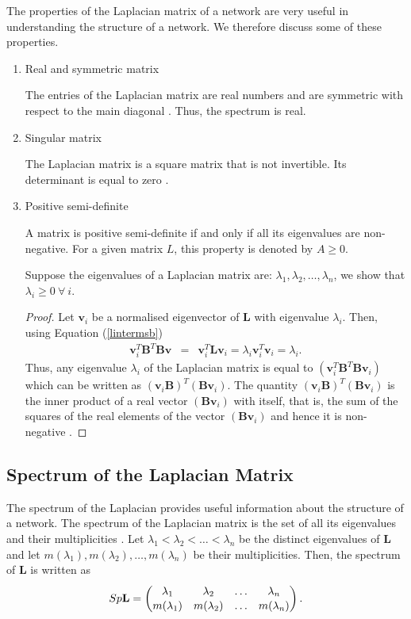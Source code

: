 \documentclass[10pt,a4paper]{article}
\begin{document}
The properties of the Laplacian matrix of a network are very useful in understanding the structure of a network. We therefore discuss some of these properties.
\begin{enumerate}	
\item{Real and symmetric matrix} 

The entries of the Laplacian matrix are real numbers and are symmetric with respect to the main diagonal \citep{das2004laplacian}. Thus, the spectrum is real.
\item{Singular matrix}

The Laplacian matrix is a square matrix that is not invertible. Its determinant is equal to zero \citep{das2004laplacian}.
\item{Positive semi-definite}

A matrix is positive semi-definite if and only if all its eigenvalues are non-negative. For a given matrix $L$, this property is denoted by $A\geq 0$. 

Suppose the eigenvalues of a Laplacian matrix are: $\lambda_1,\lambda_2,\ldots, \lambda_n$, we show that $\lambda_i \geq 0 ~\forall~i$.
\begin{proof}
	Let $\mathbf{v}_i$ be a normalised eigenvector of $\mathbf{L}$ with eigenvalue $\lambda_i$. Then, using Equation (\ref{lintermsb})
	\begin{eqnarray*}
		\mathbf{v}_i^T \mathbf{B}^T \mathbf{B} \mathbf{v} &=& \mathbf{v}_i^T \mathbf{L} \mathbf{v}_i = \lambda_i  \mathbf{v}_i^T \mathbf{v}_i  = \lambda_i.
	\end{eqnarray*}  
	Thus, any eigenvalue $\lambda_i$ of the Laplacian matrix is equal 
	to $(\mathbf{v}_i^T \mathbf{B}^T \mathbf{B} \mathbf{v}_i)$ which can be written as $(\mathbf{v}_i \mathbf{B})^T (\mathbf{B} \mathbf{v}_i)$. The quantity $(\mathbf{v}_i \mathbf{B})^T (\mathbf{B} \mathbf{v}_i)$  is the inner product of a real vector $(\mathbf{B} \mathbf{v}_i)$ with itself, that is, the sum of the squares of the real elements of the vector $(\mathbf{B} \mathbf{v}_i)$ and hence it is non-negative \citep{estrada2015first}.
\end{proof}

\end{enumerate}
\subsection{Spectrum of the Laplacian Matrix}
The spectrum of the Laplacian provides useful information about the structure of a network. The spectrum of the Laplacian matrix is the set of all its eigenvalues and their multiplicities \citep{estrada2011structure}. Let $\lambda_1 < \lambda_2 < \ldots < \lambda_n$ be the distinct eigenvalues of $\mathbf{L}$ and let $m(\lambda_1),m(\lambda_2), \ldots,m(\lambda_n)$ be their multiplicities. Then, the spectrum of $\mathbf{L}$ is written as
\begin{eqnarray}
Sp\mathbf{L} = 
\renewcommand*{\arraystretch}{1.1}
\begin{pmatrix*}
\lambda_1 & \lambda_2 & \ldots & \lambda_n \\
m(\lambda_1) & m(\lambda_2) & \ldots & m(\lambda_n)
\end{pmatrix*}.
\end{eqnarray}
\end{document}
